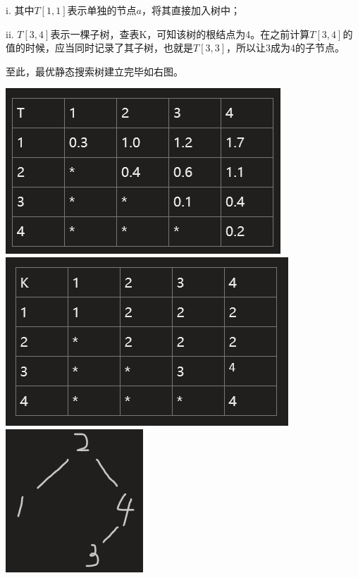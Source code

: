 \documentclass[a4paper]{article}    %
\begin{document}
\indent\indent i. 其中$T[1,1]$表示单独的节点$a$，将其直接加入树中；

\indent\indent ii. $T[3,4]$表示一棵子树，查表K，可知该树的根结点为4。在之前计算$T[3,4]$的值的时候，应当同时记录了其子树，也就是$T[3,3]$，所以让3成为4的子节点。

至此，最优静态搜索树建立完毕如右图。


\begin{center}
    \includegraphics[scale=0.4]{42.png}
    \includegraphics[scale=0.4]{43.png}
    \includegraphics[scale=0.4]{44.png}
\end{center}
\end{document}
